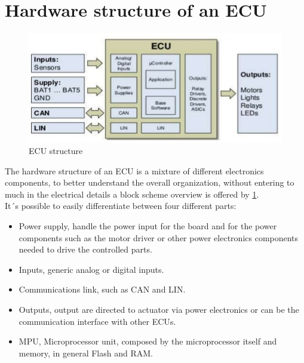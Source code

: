 \documentclass[../main.tex]{subfiles}
\begin{document}
\section{Hardware structure of an ECU}
\begin{figure}[h]
    \centering
    \includegraphics[width=\linewidth]{images_folder/electronic-control-unitecu-6-638.jpg}
    \caption{ECU structure}
    \label{fig:ECUHW}
\end{figure}
The hardware structure of an \gls{ECU} is a mixture of different electronics components, to better understand the overall organization, without entering to much in the electrical details a block scheme overview is offered by \ref{fig:ECUHW}.\\
It´s possible to easily differentiate between four different parts:
\begin{itemize}
    \item Power supply, handle the power input for the board and for the power components such as the motor driver or other power electronics components needed to drive the controlled parts. 
    \item Inputs, generic analog or digital inputs.
    \item Communications link, such as \gls{CAN} and \gls{LIN}.
    \item Outputs, output are directed to actuator via power electronics or can be the communication interface with other \gls{ECU}s.
    \item \gls{MPU}, Microprocessor unit, composed by the microprocessor itself and memory, in general Flash and \gls{RAM}. 
\end{itemize}
\end{document}
